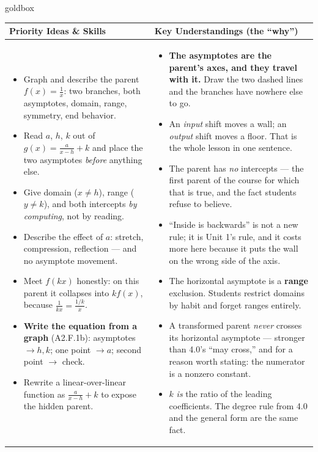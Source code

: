 \documentclass[10pt]{article}
\begin{document}
\renewcommand{\arraystretch}{1.4}
\begin{skillbox}{goldbox}
\begin{tabularx}{\linewidth}{@{}X|X@{}}
\textbf{Priority Ideas \& Skills} & \textbf{Key Understandings (the ``why'')} \\[2pt]
\hline
\vspace{-6pt}
\begin{itemize}[leftmargin=1.1em, nosep, after=\vspace{2pt}]
  \item Graph and describe the parent $f(x)=\frac1x$: two branches, both asymptotes, domain, range, symmetry, end behavior.
  \item Read $a$, $h$, $k$ out of $g(x)=\frac{a}{x-h}+k$ and place the two asymptotes \emph{before} anything else.
  \item Give domain ($x\neq h$), range ($y\neq k$), and both intercepts \emph{by computing}, not by reading.
  \item Describe the effect of $a$: stretch, compression, reflection --- and no asymptote movement.
  \item Meet $f(kx)$ honestly: on this parent it collapses into $kf(x)$, because $\frac{1}{kx}=\frac{1/k}{x}$.
  \item \textbf{Write the equation from a graph} (A2.F.1b): asymptotes $\rightarrow h,k$; one point $\rightarrow a$; second point $\rightarrow$ check.
  \item Rewrite a linear-over-linear function as $\frac{a}{x-h}+k$ to expose the hidden parent.
\end{itemize}
&
\vspace{-6pt}
\begin{itemize}[leftmargin=1.1em, nosep, after=\vspace{2pt}]
  \item \textbf{The asymptotes are the parent's axes, and they travel with it.} Draw the two dashed lines and the branches have nowhere else to go.
  \item An \emph{input} shift moves a wall; an \emph{output} shift moves a floor. That is the whole lesson in one sentence.
  \item The parent has \emph{no} intercepts --- the first parent of the course for which that is true, and the fact students refuse to believe.
  \item ``Inside is backwards'' is not a new rule; it is Unit 1's rule, and it costs more here because it puts the wall on the wrong side of the axis.
  \item The horizontal asymptote is a \textbf{range} exclusion. Students restrict domains by habit and forget ranges entirely.
  \item A transformed parent \emph{never} crosses its horizontal asymptote --- stronger than 4.0's ``may cross,'' and for a reason worth stating: the numerator is a nonzero constant.
  \item $k$ \emph{is} the ratio of the leading coefficients. The degree rule from 4.0 and the general form are the same fact.
\end{itemize}
\end{tabularx}
\end{skillbox}
\end{document}
